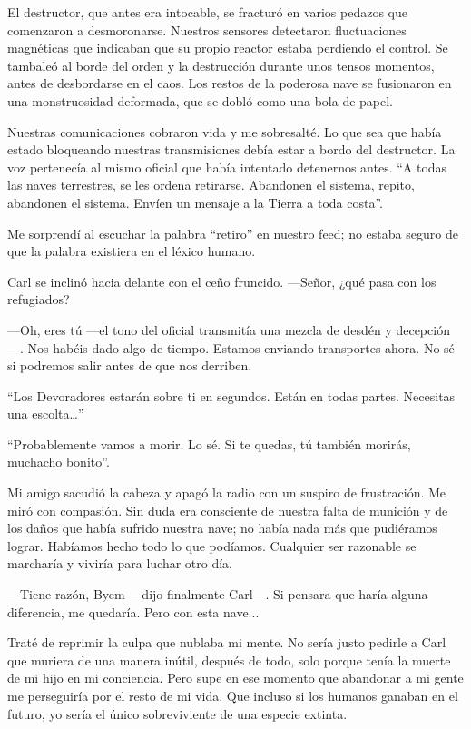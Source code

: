 El destructor, que antes era intocable, se fracturó en varios pedazos que comenzaron a desmoronarse. Nuestros sensores detectaron fluctuaciones magnéticas que indicaban que su propio reactor estaba perdiendo el control. Se tambaleó al borde del orden y la destrucción durante unos tensos momentos, antes de desbordarse en el caos. Los restos de la poderosa nave se fusionaron en una monstruosidad deformada, que se dobló como una bola de papel.

Nuestras comunicaciones cobraron vida y me sobresalté. Lo que sea que había estado bloqueando nuestras transmisiones debía estar a bordo del destructor. La voz pertenecía al mismo oficial que había intentado detenernos antes. ``A todas las naves terrestres, se les ordena retirarse. Abandonen el sistema, repito, abandonen el sistema. Envíen un mensaje a la Tierra a toda costa''.

Me sorprendí al escuchar la palabra ``retiro''
 en nuestro feed; no estaba seguro de que la palabra existiera en el léxico humano.

Carl se inclinó hacia delante con el ceño fruncido. —Señor, ¿qué pasa con los refugiados?

—Oh, eres tú —el tono del oficial transmitía una mezcla de desdén y decepción—. Nos habéis dado algo de tiempo. Estamos enviando transportes ahora. No sé si podremos salir antes de que nos derriben.

``Los Devoradores estarán sobre ti en segundos. Están en todas partes. Necesitas una escolta…''

``Probablemente vamos a morir. Lo sé. Si te quedas, tú también morirás, muchacho bonito''.

Mi amigo sacudió la cabeza y apagó la radio con un suspiro de frustración. Me miró con compasión. Sin duda era consciente de nuestra falta de munición y de los daños que había sufrido nuestra nave; no había nada más que pudiéramos lograr. Habíamos hecho todo lo que podíamos. Cualquier ser razonable se marcharía y viviría para luchar otro día.

—Tiene razón, Byem —dijo finalmente Carl—. Si pensara que haría alguna diferencia, me quedaría. Pero con esta nave...

Traté de reprimir la culpa que nublaba mi mente. No sería justo pedirle a Carl que muriera de una manera inútil, después de todo, solo porque tenía la muerte de mi hijo en mi conciencia. Pero supe en ese momento que abandonar a mi gente me perseguiría por el resto de mi vida. Que incluso si los humanos ganaban en el futuro, yo sería el único sobreviviente de una especie extinta.

